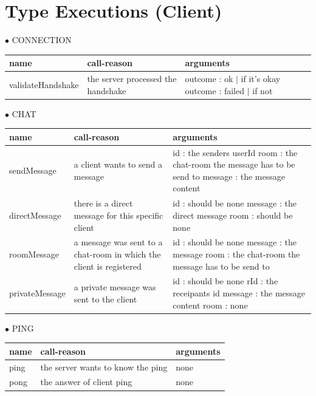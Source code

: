 \documentclass{scrartcl}
\newcommand{\n}{\newline}
\begin{document}
\section{Type Executions (Client)}
$\bullet$ CONNECTION
\begin{center}
    \begin{tabular}{| p{3.1cm} | p{5cm} | p{5.9cm} |}
        \hline
        \textbf{name} & \textbf{call-reason} & \textbf{arguments} \\ \hline
        validateHandshake & the server processed the handshake & outcome : ok $|$ if it's okay \n
        outcome : failed $|$ if not \\ \hline 
    \end{tabular}
\end{center}
$\bullet$ CHAT
\begin{center}
    \begin{tabular}{| p{3.1cm} | p{5cm} | p{5.9cm} |}
        \hline
        \textbf{name} & \textbf{call-reason} & \textbf{arguments} \\ \hline
        sendMessage & a client wants to send a message & 
        id : the senders userId\n
        room : the chat-room the message has to be send to\n
        message : the message content \\ \hline

        directMessage & there is a direct message for this specific client & id : should be none \n
        message : the direct message \n
        room : should be none \\ \hline

        roomMessage & a message was sent to a chat-room in which the client is registered & id : should be none \n
        message : the message \n
        room : the chat-room the message has to be send to \\ \hline

        privateMessage & a private message was sent to the client & id : should be none \n
        rId : the receipants id \n
        message : the message content \n
        room : none \\ \hline
    \end{tabular}
\end{center}
$\bullet$ PING
\begin{center}
    \begin{tabular}{| p{3.1cm} | p{5cm} | p{5.9cm} |}
        \hline
        \textbf{name} & \textbf{call-reason} & \textbf{arguments} \\ \hline
        ping & the server wants to know the ping & none \\ \hline
        pong & the answer of client ping & none \\ \hline
    \end{tabular}
\end{center}
\end{document}
